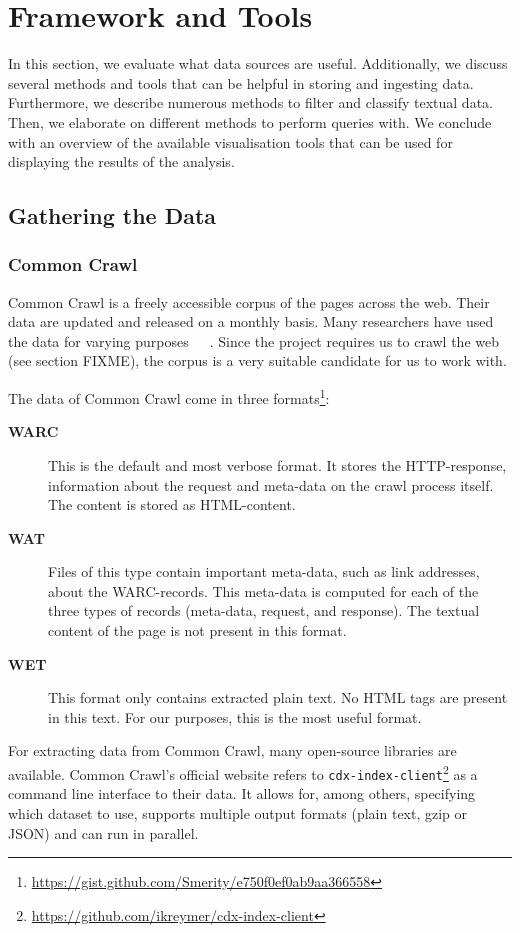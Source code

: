 \section{Framework and Tools}
In this section, we evaluate what data sources are useful. Additionally, we discuss several methods and tools that can be helpful in storing and ingesting data. Furthermore, we describe numerous methods to filter and classify textual data. Then, we elaborate on different methods to perform queries with. We conclude with an overview of the available visualisation tools that can be used for displaying the results of the analysis.

\subsection{Gathering the Data}

\subsubsection{Common Crawl}
Common Crawl \cite{commoncrawl} is a freely accessible corpus of the pages across the web. Their data are updated and released on a monthly basis. Many researchers have used the data for varying purposes~\cite{smith2013dirt}~\cite{muhleisen2012web}~\cite{singh2012wikilinks}. Since the project requires us to crawl the web (see section {\color{red} FIXME}), the corpus is a very suitable candidate for us to work with.

The data of Common Crawl come in three formats\footnote{\url{https://gist.github.com/Smerity/e750f0ef0ab9aa366558}}: 
\begin{description}
\item[\textbf{WARC}] This is the default and most verbose format. It stores the HTTP-response, information about the request and meta-data on the crawl process itself. The content is stored as HTML-content.
\item[\textbf{WAT}] Files of this type contain important meta-data, such as link addresses, about the WARC-records. This meta-data is computed for each of the three types of records (meta-data, request, and response). The textual content of the page is not present in this format.
\item[\textbf{WET}] This format only contains extracted plain text. No HTML tags are present in this text. For our purposes, this is the most useful format.
\end{description}

For extracting data from Common Crawl, many open-source libraries are available. Common Crawl's official website refers to \texttt{cdx-index-client}\footnote{\url{https://github.com/ikreymer/cdx-index-client}} as a command line interface to their data. It allows for, among others, specifying which dataset to use, supports multiple output formats (plain text, gzip or JSON) and can run in parallel.

